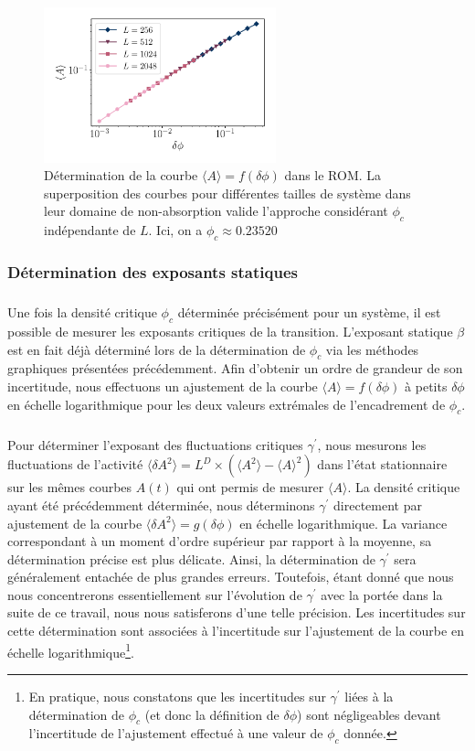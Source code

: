 \begin{figure}[h]
	\centering
	\includegraphics[width=0.6\textwidth]{Chapitre2/Figures/Phi_cindep.pdf}
	\caption{Détermination de la courbe $\langle A \rangle = f(\delta\phi)$ dans le ROM. La superposition des courbes pour différentes tailles de système dans leur domaine de non-absorption valide l'approche considérant $\phi_c$ indépendante de $L$. Ici, on a $\phi_c \approx 0.23520$}
	\label{fig:Effet_Taille_Phic}
\end{figure}

\subsubsection{Détermination des exposants statiques}

\subparagraph{}Une fois la densité critique $\phi_c$ déterminée précisément pour un système, il est possible de mesurer les exposants critiques de la transition. L'exposant statique $\beta$ est en fait déjà déterminé lors de la détermination de $\phi_c$ via les méthodes graphiques présentées précédemment. Afin d'obtenir un ordre de grandeur de son incertitude, nous effectuons un ajustement de la courbe $\langle A \rangle = f(\delta\phi)$ à petits $\delta\phi$ en échelle logarithmique pour les deux valeurs extrémales de l'encadrement de $\phi_c$.

\subparagraph{}Pour déterminer l'exposant des fluctuations critiques $\gamma^\prime$, nous mesurons les fluctuations de l'activité $\langle \delta A^2\rangle = L^D\times(\langle A ^2 \rangle - \langle A \rangle^2)$ dans l'état stationnaire sur les mêmes courbes $A(t)$ qui ont permis de mesurer $\langle A \rangle$. La densité critique ayant été précédemment déterminée, nous déterminons $\gamma^\prime$ directement par ajustement de la courbe $\langle \delta A^2\rangle = g(\delta\phi)$ en échelle logarithmique. La variance correspondant à un moment d'ordre supérieur par rapport à la moyenne, sa détermination précise est plus délicate. Ainsi, la détermination de $\gamma^\prime$ sera généralement entachée de plus grandes erreurs. Toutefois, étant donné que nous nous concentrerons essentiellement sur l'évolution de $\gamma^\prime$ avec la portée dans la suite de ce travail, nous nous satisferons d'une telle précision. Les incertitudes sur cette détermination sont associées à l'incertitude sur l'ajustement de la courbe en échelle logarithmique\footnote{En pratique, nous constatons que les incertitudes sur $\gamma^\prime$ liées à la détermination de $\phi_c$ (et donc la définition de $\delta\phi$) sont négligeables devant l'incertitude de l'ajustement effectué à une valeur de $\phi_c$ donnée.}.

